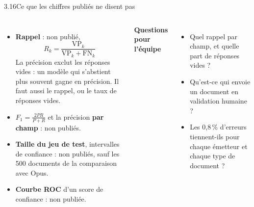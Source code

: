 \documentclass[11pt,aspectratio=169]{beamer}
\newcommand{\pct}[1]{#1\,\%}
\newcommand{\VP}{\mathrm{VP}}
\newcommand{\FN}{\mathrm{FN}}
\begin{document}
\begin{frame}{3.16\quad Ce que les chiffres publiés ne disent pas}
  \begin{columns}[T]
    \small
    \begin{itemize}
      \item \textbf{Rappel} : non publié,
        \[
          R_k = \frac{\VP_k}{\VP_k + \FN_k}
        \]
        La précision exclut les réponses vides : un modèle qui s'abstient plus souvent gagne
        en précision. Il faut aussi le rappel, ou le taux de réponses vides.
      \item \textbf{$F_1 = \frac{2PR}{P + R}$} et la précision \textbf{par champ} : non publiés.
      \item \textbf{Taille du jeu de test}, intervalles de confiance : non publiés, sauf les
        500 documents de la comparaison avec Opus.
      \item \textbf{Courbe ROC} d'un score de confiance : non publiée.
    \end{itemize}
    \textbf{Questions pour l'équipe}
    {\small
    \begin{itemize}
      \item Quel rappel par champ, et quelle part de réponses vides ?
      \item Qu'est-ce qui envoie un document en validation humaine ?
      \item Les \pct{0,8} d'erreurs tiennent-ils pour chaque émetteur et chaque type de
        document ?
    \end{itemize}}
  \end{columns}
\end{frame}
\end{document}
